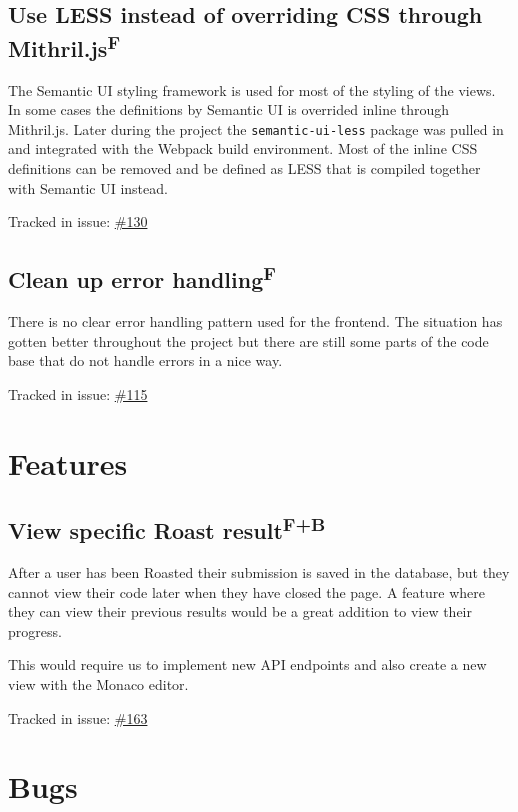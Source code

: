 \documentclass[12pt,a4paper]{report}
\begin{document}
\subsection{Use LESS instead of overriding CSS through Mithril.js\texorpdfstring{\textsuperscript{F}}{}}
The Semantic UI styling framework is used for most of the styling of the views. In some cases the definitions by Semantic UI is overrided inline through Mithril.js. Later during the project the \texttt{semantic-ui-less} package was pulled in and integrated with the Webpack build environment. Most of the inline CSS definitions can be removed and be defined as LESS that is compiled together with Semantic UI instead.

Tracked in issue: \href{https://github.com/LuleaUniversityOfTechnology/2018-project-roaster/issues/130}{\#130}

\subsection{Clean up error handling\texorpdfstring{\textsuperscript{F}}{}}
There is no clear error handling pattern used for the frontend. The situation has gotten better throughout the project but there are still some parts of the code base that do not handle errors in a nice way.

Tracked in issue: \href{https://github.com/LuleaUniversityOfTechnology/2018-project-roaster/issues/115}{\#115}

\section{Features}
\subsection{View specific Roast result\texorpdfstring{\textsuperscript{F+B}}{}}
After a user has been Roasted their submission is saved in the database, but they cannot view their code later when they have closed the page. A feature where they can view their previous results would be a great addition to view their progress.

This would require us to implement new API endpoints and also create a new view with the Monaco editor.

Tracked in issue: \href{https://github.com/LuleaUniversityOfTechnology/2018-project-roaster/issues/163}{\#163}

\section{Bugs}
\end{document}
